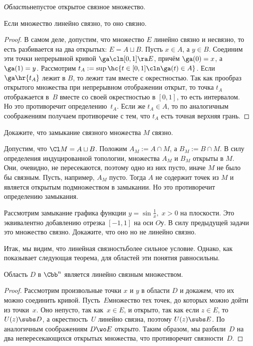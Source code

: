 \documentclass[a4paper]{article}
\begin{document}
\begin{df}
\emph{Область}\т непустое открытое связное множество.
\end{df}

\begin{stm}
Если множество линейно связно, то оно связно.
\end{stm}
\begin{proof}
В самом деле, допустим, что множество $E$ линейно связно и несвязно, то есть разбивается на два открытых: $E = A \sqcup B$.
Пусть $x \in A$, а $y \in B$. Соединим эти точки непрерывной кривой $\ga\cln[0,1]\ra E$, причём $\ga(0)=x$, а $\ga(1)=y$.
Рассмотрим $t_A := \sup\hc{t \in [0,1] \cln \ga(t) \in A}$. Если $\ga\hr{t_A}$ лежит в $B$, то лежит там вместе с
окрестностью. Так как прообраз открытого множества при непрерывном отображении открыт, то точка $t_A$
отображается в~$B$ вместе со своей окрестностью в $[0,1]$, то есть интервалом. Но это противоречит определению~$t_A$.
Если же $t_A \in A$, то по аналогичным соображениям получаем противоречие с тем, что $t_A$ есть точная верхняя грань.
\end{proof}

\begin{problem}
Докажите, что замыкание связного множества $M$ связно.
\end{problem}
\begin{solution}
Допустим, что $\Cl M = A \sqcup B$. Положим $A_M := A \cap M$, а $B_M := B \cap M$.
В силу определения индуцированной топологии, множества $A_M$ и $B_M$ открыты в $M$.
Они, очевидно, не пересекаются, поэтому одно из них пусто, иначе $M$ не было бы связным.
Пусть, например, $A_M$ пусто. Тогда $A$ не содержит точек из $M$ и является открытым подмножеством
в замыкании. Но это противоречит определению замыкания.
\end{solution}


\begin{problem}
Рассмотрим замыкание графика функции $y = \sin \frac{1}{x},\; x > 0$ на плоскости. Это эквивалентно
добавлению отрезка $[-1,1]$ на оси $Oу$. В силу предыдущей задачи это множество связно.
Докажите, что оно но не линейно связно.
\end{problem}

Итак, мы видим, что линейная связность\т более сильное условие. Однако, как показывает
следующая теорема, для областей эти понятия равносильны.

\begin{theorem}
Область $D$ в $\Cbb^n$ является линейно связным множеством.
\end{theorem}
\begin{proof}
Рассмотрим произвольные точки $x$ и $y$ в области $D$ и докажем, что их можно соединить кривой.
Пусть~$E$\т множество тех точек, до которых можно дойти из точки~$x$. Оно непусто, так как~${x \in E}$, и открыто,
так как если ${z \in E}$, то $U(z) \subs D$, а окрестность~$U$ линейно связна, поэтому $U(z) \subs E$. По
аналогичным соображениям $D \wo E$ открыто. Таким образом, мы разбили~$D$ на два
непересекающихся открытых множества, что противоречит связности~$D$.
\end{proof}
\end{document}
